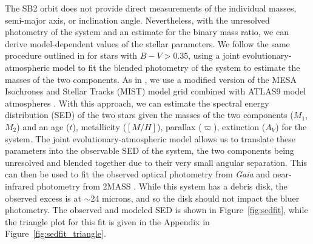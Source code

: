 \documentclass[]{aastex701} %
\begin{document}
  The SB2 orbit does not provide direct measurements of the individual masses, semi-major axis, or inclination angle. Nevertheless, with the unresolved photometry of the system and an estimate for the binary mass ratio, we can derive model-dependent values of the stellar parameters. We follow the same procedure outlined in \citet{nielsen:2019} for stars with $B-V > 0.35$, using a joint evolutionary-atmospheric model to fit the blended photometry of the system to estimate the masses of the two components. As in \citet{nielsen:2019}, we use a modified version of the MESA Isochrones and Stellar Tracks (MIST) model grid \citep{Dotter:2016,Choi:2016} combined with ATLAS9 model atmospheres \citep{Castelli:2003}. With this approach, we can estimate the spectral energy distribution (SED) of the two stars given the masses of the two components ($M_1$, $M_2$) and an age ($t$), metallicity ($[M/H]$), parallax ($\varpi$), extinction ($A_V$) for the system. The joint evolutionary-atmospheric model allows us to translate these parameters into the observable SED of the system, the two components being unresolved and blended together due to their very small angular separation. This can then be used to fit the observed optical photometry from {\it Gaia} \citep{GaiaDR3} and near-infrared photometry from 2MASS \citep{Skrutskie:2006}. While this system has a debris disk, the observed excess is at $\sim$24 microns, and so the disk should not impact the bluer photometry. The observed and modeled SED is shown in Figure~\ref{fig:sedfit}, while the triangle plot for this fit is given in the Appendix in Figure~\ref{fig:sedfit_triangle}.

\end{document}
